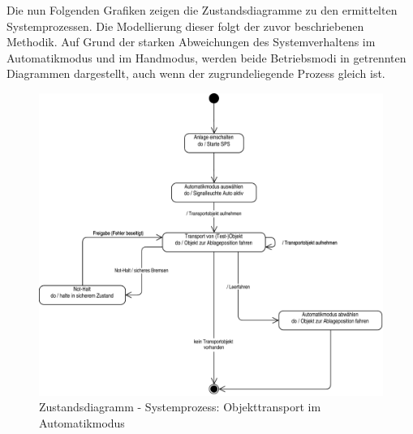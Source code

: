 \documentclass[../../../Bachelorarbeit.tex]{subfiles}
\begin{document}
Die nun Folgenden Grafiken zeigen die Zustandsdiagramme zu den ermittelten Systemprozessen. Die Modellierung dieser folgt der zuvor beschriebenen Methodik. Auf Grund der starken Abweichungen des Systemverhaltens im Automatikmodus und im Handmodus, werden beide Betriebsmodi in getrennten Diagrammen dargestellt, auch wenn der zugrundeliegende Prozess gleich ist. 

\begin{figure}[H]
    \centering
    \includegraphics[width=\textwidth]{Images/auto_zustand.pdf}
    \caption[Zustandsdiagramm Automatikmodus]{Zustandsdiagramm - Systemprozess: Objekttransport im Automatikmodus}
    \label{fig:my-img4}
\end{figure}
\end{document}
